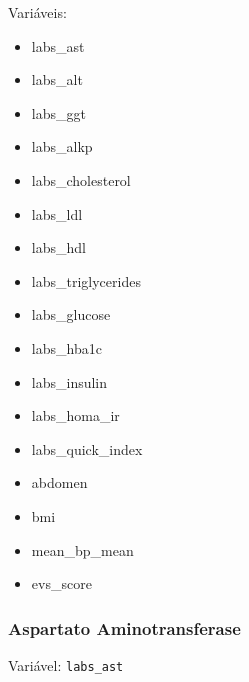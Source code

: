 \documentclass[
  letterpaper,
  DIV=11,
  numbers=noendperiod]{scrartcl}
\providecommand{\tightlist}{%
  \setlength{\itemsep}{0pt}\setlength{\parskip}{0pt}}\usepackage{longtable,booktabs,array}
\begin{document}
Variáveis:

\begin{itemize}
\tightlist
\item
  labs\_ast
\item
  labs\_alt
\item
  labs\_ggt
\item
  labs\_alkp
\item
  labs\_cholesterol
\item
  labs\_ldl
\item
  labs\_hdl
\item
  labs\_triglycerides
\item
  labs\_glucose
\item
  labs\_hba1c
\item
  labs\_insulin
\item
  labs\_homa\_ir
\item
  labs\_quick\_index
\item
  abdomen
\item
  bmi
\item
  mean\_bp\_mean
\item
  evs\_score
\end{itemize}

\subsubsection{Aspartato
Aminotransferase}\label{aspartato-aminotransferase}

Variável: \texttt{labs\_ast}
\end{document}
